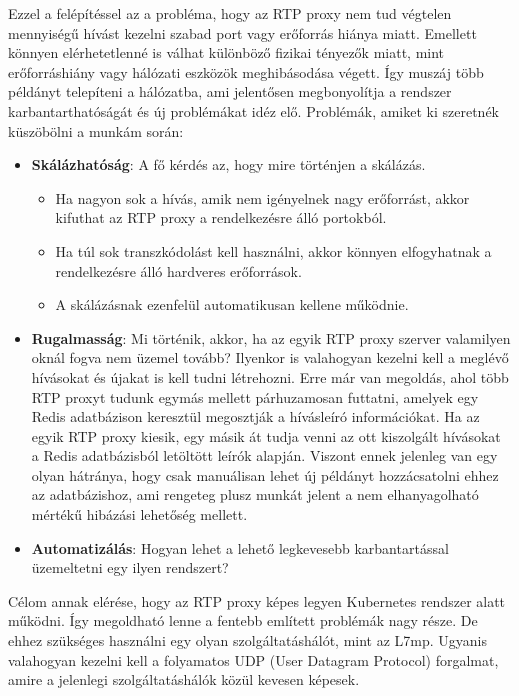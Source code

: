 Ezzel a felépítéssel az a probléma, hogy az RTP proxy nem tud végtelen mennyiségű
hívást kezelni szabad port vagy erőforrás hiánya miatt. Emellett könnyen elérhetetlenné 
is válhat különböző fizikai tényezők miatt, mint erőforráshiány vagy hálózati eszközök 
meghibásodása végett. Így muszáj több példányt telepíteni a hálózatba, ami jelentősen 
megbonyolítja a rendszer karbantarthatóságát és új problémákat idéz elő. Problémák, 
amiket ki szeretnék küszöbölni a munkám során:

\begin{itemize}
	\item \textbf{Skálázhatóság}: A fő kérdés az, hogy mire történjen a skálázás. 
	\begin{itemize}
		\item Ha nagyon sok a hívás, amik nem igényelnek nagy erőforrást, akkor
		kifuthat az RTP proxy a rendelkezésre álló portokból.
		\item Ha túl sok transzkódolást kell használni, akkor könnyen elfogyhatnak
		a rendelkezésre álló hardveres erőforrások.
		\item A skálázásnak ezenfelül automatikusan kellene működnie. 
	\end{itemize}
	\item \textbf{Rugalmasság}: Mi történik, akkor, ha az egyik RTP proxy szerver
	valamilyen oknál fogva nem üzemel tovább? Ilyenkor is valahogyan kezelni 
	kell a meglévő hívásokat és újakat is kell tudni létrehozni. Erre már van megoldás, 
	ahol több RTP proxyt tudunk egymás mellett párhuzamosan futtatni, amelyek egy Redis 
	adatbázison keresztül megosztják a hívásleíró információkat. Ha az egyik RTP proxy 
	kiesik, egy másik át tudja venni az ott kiszolgált hívásokat a Redis adatbázisból 
	letöltött leírók alapján. Viszont ennek jelenleg van egy olyan hátránya, hogy csak 
	manuálisan lehet új példányt hozzácsatolni ehhez az adatbázishoz, ami rengeteg plusz 
	munkát jelent a nem elhanyagolható mértékű hibázási lehetőség mellett.
	\item \textbf{Automatizálás}: Hogyan lehet a lehető legkevesebb 
	karbantartással üzemeltetni egy ilyen rendszert? 
\end{itemize}

Célom annak elérése, hogy az RTP proxy képes legyen Kubernetes rendszer alatt 
működni. Így megoldható lenne a fentebb említett problémák nagy része. De 
ehhez szükséges használni egy olyan szolgáltatáshálót, mint az L7mp. Ugyanis 
valahogyan kezelni kell a folyamatos UDP (User Datagram Protocol) forgalmat, amire
a jelenlegi szolgáltatáshálók közül kevesen képesek.

